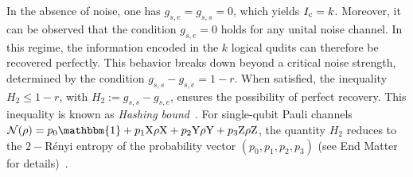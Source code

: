 \documentclass[aps,prl,twocolumn,superscriptaddress,numerical]{revtex4-2}
\newcommand{\Ic}{I_\mathrm{\rm c}} %
\newcommand{\Noise}{\mathcal{N}}
\newcommand{\idp}{e} %
\newcommand{\swp}{s} %
\newcommand{\Id}{\mathbbm{1}}
\newcommand{\PauliX}{{\text{X}}}
\newcommand{\PauliY}{{\text{Y}}}
\newcommand{\PauliZ}{{\text{Z}}}
\begin{document}
In the absence of noise, one has $g_{\swp,\idp}=g_{\swp,\swp}=0$, which yields $\Ic=k$. Moreover, it can be observed that the condition $g_{\swp,\idp}=0$ holds for any unital noise channel. In this regime, the information encoded in the $k$ logical qudits can therefore be recovered perfectly. This behavior breaks down beyond a critical noise strength, determined by the condition $g_{\swp,\swp}-g_{\swp,\idp}=1-r$. When satisfied, the inequality $H_2\leq 1-r$, with $H_2:=g_{\swp,\swp}-g_{\swp,\idp}$, ensures the possibility of perfect recovery. This inequality is known as \emph{Hashing bound}~\cite{Wilde2013QuantumInformationTheory}. For single-qubit Pauli channels $\Noise(\rho) = p_0 \Id + p_1 \PauliX \rho \PauliX + p_2 \PauliY \rho \PauliY + p_3 \PauliZ \rho \PauliZ$, the quantity $H_2$ reduces to the $2-$Rényi entropy of the probability vector $(p_0, p_1, p_2, p_3)$ (see End Matter for details)~\cite{Wilde2013QuantumInformationTheory}. \\
\end{document}
